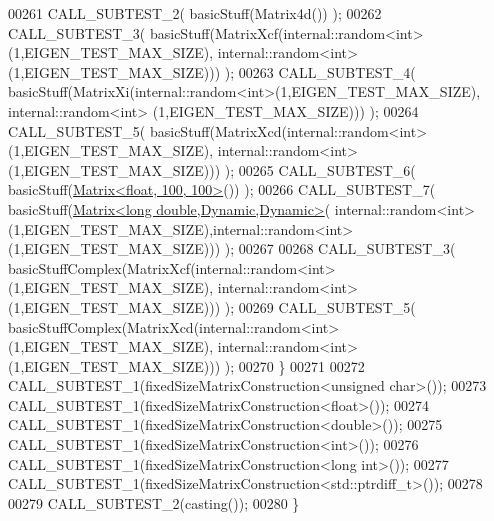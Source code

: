 \begin{DoxyCode}
00261     CALL\_SUBTEST\_2( basicStuff(Matrix4d()) );
00262     CALL\_SUBTEST\_3( basicStuff(MatrixXcf(internal::random<int>(1,EIGEN\_TEST\_MAX\_SIZE), 
      internal::random<int>(1,EIGEN\_TEST\_MAX\_SIZE))) );
00263     CALL\_SUBTEST\_4( basicStuff(MatrixXi(internal::random<int>(1,EIGEN\_TEST\_MAX\_SIZE), internal::random<int>
      (1,EIGEN\_TEST\_MAX\_SIZE))) );
00264     CALL\_SUBTEST\_5( basicStuff(MatrixXcd(internal::random<int>(1,EIGEN\_TEST\_MAX\_SIZE), 
      internal::random<int>(1,EIGEN\_TEST\_MAX\_SIZE))) );
00265     CALL\_SUBTEST\_6( basicStuff(\hyperlink{group___core___module_class_eigen_1_1_matrix}{Matrix<float, 100, 100>}()) );
00266     CALL\_SUBTEST\_7( basicStuff(\hyperlink{group___core___module_class_eigen_1_1_matrix}{Matrix<long double,Dynamic,Dynamic>}(
      internal::random<int>(1,EIGEN\_TEST\_MAX\_SIZE),internal::random<int>(1,EIGEN\_TEST\_MAX\_SIZE))) );
00267 
00268     CALL\_SUBTEST\_3( basicStuffComplex(MatrixXcf(internal::random<int>(1,EIGEN\_TEST\_MAX\_SIZE), 
      internal::random<int>(1,EIGEN\_TEST\_MAX\_SIZE))) );
00269     CALL\_SUBTEST\_5( basicStuffComplex(MatrixXcd(internal::random<int>(1,EIGEN\_TEST\_MAX\_SIZE), 
      internal::random<int>(1,EIGEN\_TEST\_MAX\_SIZE))) );
00270   \}
00271 
00272   CALL\_SUBTEST\_1(fixedSizeMatrixConstruction<unsigned char>());
00273   CALL\_SUBTEST\_1(fixedSizeMatrixConstruction<float>());
00274   CALL\_SUBTEST\_1(fixedSizeMatrixConstruction<double>());
00275   CALL\_SUBTEST\_1(fixedSizeMatrixConstruction<int>());
00276   CALL\_SUBTEST\_1(fixedSizeMatrixConstruction<long int>());
00277   CALL\_SUBTEST\_1(fixedSizeMatrixConstruction<std::ptrdiff\_t>());
00278 
00279   CALL\_SUBTEST\_2(casting());
00280 \}
\end{DoxyCode}

